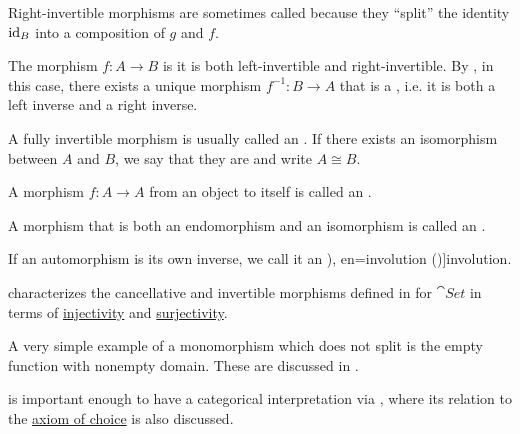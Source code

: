 \begin{definition}
\begin{thmenum}
    Right-invertible morphisms are sometimes called  because they \enquote{split} the identity \( \operatorname{id}_B \) into a composition of \( g \) and \( f \).

     The morphism \( f: A \to B \) is  it is both left-invertible and right-invertible. By , in this case, there exists a unique morphism \( f^{-1}: B \to A \) that is a , i.e. it is both a left inverse and a right inverse.

    A fully invertible morphism is usually called an . If there exists an isomorphism between \( A \) and \( B \), we say that they are  and write \( A \cong B \).

     A morphism \( f: A \to A \) from an object to itself is called an .

     A morphism that is both an endomorphism and an isomorphism is called an .

     If an automorphism is its own inverse, we call it an \term[ru=инволюция (\cite[97]{АлександровМаркушевичХинчин1963ЭнциклопедияТом4}), en=involution (\cite[36]{Schechter1997AnalysisHandbook})]{involution}.
  \end{thmenum}
\end{definition}

\begin{example}\label{ex:def:morphism_invertibility}
   characterizes the cancellative and invertible morphisms defined in  for \hyperref[def:category_of_small_sets]{\( \cat{Set} \)} in terms of \hyperref[def:function_invertibility/injective]{injectivity} and \hyperref[def:function_invertibility/injective]{surjectivity}.

  A very simple example of a monomorphism which does not split is the empty function with nonempty domain. These are discussed in .

   is important enough to have a categorical interpretation via , where its relation to the \hyperref[def:zfc/choice]{axiom of choice} is also discussed.
\end{example}

